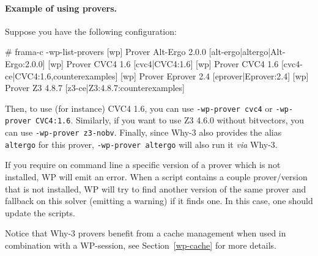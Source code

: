 \paragraph{Example of using provers.}
Suppose you have the following configuration:

\begin{logs}
# frama-c -wp-list-provers
[wp] Prover   Alt-Ergo 2.0.0  [alt-ergo|altergo|Alt-Ergo:2.0.0]
[wp] Prover       CVC4 1.6    [cvc4|CVC4:1.6]
[wp] Prover       CVC4 1.6    [cvc4-ce|CVC4:1.6,counterexamples]
[wp] Prover    Eprover 2.4    [eprover|Eprover:2.4]
[wp] Prover         Z3 4.8.7  [z3-ce|Z3:4.8.7:counterexamples]
\end{logs}

Then, to use (for instance) \textsf{CVC4 1.6},
you can use \verb+-wp-prover cvc4+ or \verb+-wp-prover CVC4:1.6+.
Similarly, if you want to use \textsf{Z3 4.6.0} without bitvectors, you can use \verb+-wp-prover z3-nobv+.
Finally, since \textsf{Why-3} also provides the alias
\verb+altergo+ for this prover, \verb+-wp-prover altergo+ will also run it \emph{via} \textsf{Why-3}.

If you require on command line a specific version of a prover which is not
installed, \textsf{WP} will emit an error. When a script contains a couple
prover/version that is not installed, \textsf{WP} will try to find another
version of the same prover and fallback on this solver (emitting a warning) if
it finds one. In this case, one should update the scripts.

Notice that \textsf{Why-3} provers benefit from a cache management when used in combination
with a \textsf{WP}-session, see Section~\ref{wp-cache} for more details.



